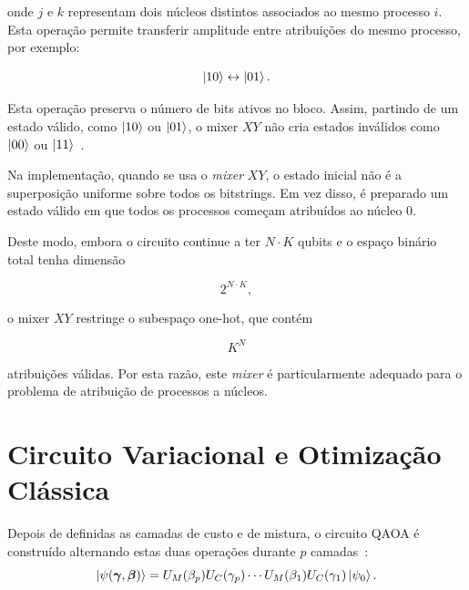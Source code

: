 onde $j$ e $k$ representam dois núcleos distintos associados ao mesmo processo $i$.
Esta operação permite transferir amplitude entre atribuições do mesmo
processo, por exemplo:

\begin{equation}
   \ket{10} \leftrightarrow \ket{01}.
\end{equation}

Esta operação preserva o número de bits ativos no
bloco. Assim, partindo de um estado válido, como $\ket{10}$ ou $\ket{01}$, o mixer
$XY$ não cria estados inválidos como $\ket{00}$ ou $\ket{11}$~\cite{Wang2019XYMixers,Fuchs2022ConstrainedMixers}.

Na implementação, quando se usa o \textit{mixer} $XY$, o estado inicial não é a
superposição uniforme sobre todos os bitstrings. Em vez disso, é preparado um
estado válido em que todos os processos começam atribuídos ao núcleo $0$.

Deste modo, embora o circuito continue a ter $N \cdot K$ qubits e o espaço binário
total tenha dimensão

\begin{equation}
    2^{N \cdot K},
\end{equation}

o mixer $XY$ restringe o subespaço one-hot, que contém

\begin{equation}
    K^N
\end{equation}

atribuições válidas. Por esta razão, este \textit{mixer} é particularmente adequado para o
problema de atribuição de processos a núcleos.

\section{Circuito Variacional e Otimização Clássica}
\label{sec:circuito-variacional-otimizacao}

Depois de definidas as camadas de custo e de mistura, o circuito \acs{QAOA} é construído alternando estas duas operações durante $p$ camadas~\cite{Farhi2014QAOA}:
\begin{equation}
\ket{\psi(\boldsymbol{\gamma},\boldsymbol{\beta})}
=
U_M(\beta_p)U_C(\gamma_p)
\cdots
U_M(\beta_1)U_C(\gamma_1)
\ket{\psi_0}.
\end{equation}

